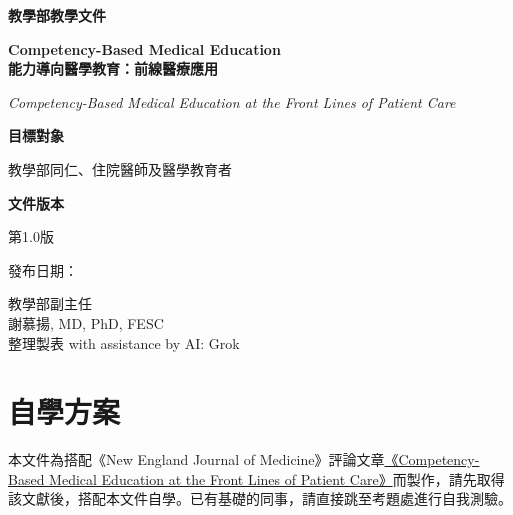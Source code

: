 \documentclass[12pt,a4paper]{article}
\newcommand{\mydate}{\DTMtoday}
\begin{document}
\begin{titlepage}
    \centering
    {\LARGE\textcolor{emergency_red}{\textbf{教學部教學文件}}\par}
    \vspace{1cm}
    {\huge\bfseries Competency-Based Medical Education\\能力導向醫學教育：前線醫療應用\par}
    \vspace{0.5cm}
    {\Large\textcolor{emergency_blue}{\textit{Competency-Based Medical Education at the Front Lines of Patient Care}}\par}
    \vspace{1cm}
    
    \begin{tcolorbox}[
        colback=emergency_blue!5!white,
        colframe=emergency_blue,
        width=0.8\textwidth,
        arc=10pt,
        boxrule=1pt
    ]
    \centering
    {\large\textbf{目標對象}\par}
    \vspace{0.3cm}
    教學部同仁、住院醫師及醫學教育者\par
    \vspace{0.5cm}
    {\large\textbf{文件版本}\par}
    \vspace{0.3cm}
    第1.0版\par
    發布日期：\mydate\par
    \end{tcolorbox}

    \vfill
    
    {\large 教學部副主任\\謝慕揚, MD, PhD, FESC\\
    整理製表 with assistance by AI: Grok\par}
    
    \vspace{0.5cm}
\end{titlepage}

\newpage
\tableofcontents
\newpage

\section{自學方案}
本文件為搭配《New England Journal of Medicine》評論文章\href{https://www.nejm.org/doi/full/10.1056/NEJMra2411880?query=featured_secondary_home}{《Competency-Based Medical Education at the Front Lines of Patient Care》}而製作，請先取得該文獻後，搭配本文件自學。已有基礎的同事，請直接跳至考題處進行自我測驗。
\end{document}
